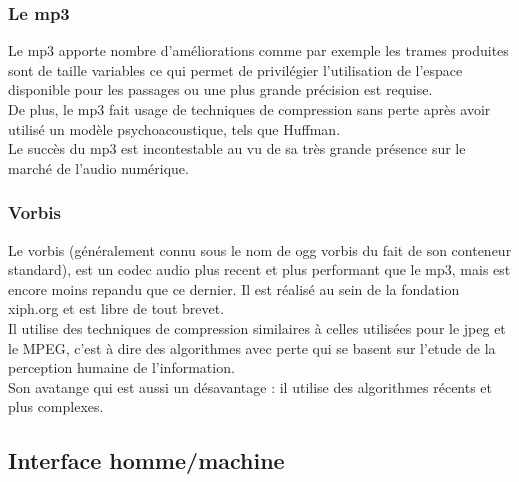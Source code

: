 \documentclass[a4paper,12pt]{article}
\begin{document}
		\subsubsection{Le mp3}
Le  mp3 apporte  nombre d'améliorations  comme  par  exemple  les trames
produites  sont  de  taille  variables  ce  qui  permet  de  privilégier
l'utilisation  de l'espace  disponible pour  les  passages  ou  une plus
grande précision est requise.\\
De plus, le mp3 fait usage de techniques de compression sans perte après
avoir utilisé un modèle psychoacoustique, tels que Huffman.\\
Le succès du mp3 est incontestable au  vu de sa très grande présence sur
le marché de l'audio numérique.

		\subsubsection{Vorbis}
Le vorbis (g\'en\'eralement  connu sous le nom de ogg  vorbis du fait de
son  conteneur  standard),  est  un  codec  audio  plus  recent  et plus
performant que le mp3, mais est encore moins repandu que ce dernier.  Il
est r\'ealis\'e  au sein de la  fondation xiph.org et est  libre de tout
brevet.\\
Il  utilise   des  techniques  de  compression   similaires  \`a  celles
utilis\'ees pour le jpeg et le MPEG, c'est \`a dire des algorithmes avec
perte  qui   se  basent  sur   l'etude  de  la   perception  humaine  de
l'information.\\
Son avatange qui est aussi un d\'esavantage : il utilise des algorithmes
r\'ecents et plus complexes.

\newpage

	\subsection{Interface homme/machine}
\end{document}
